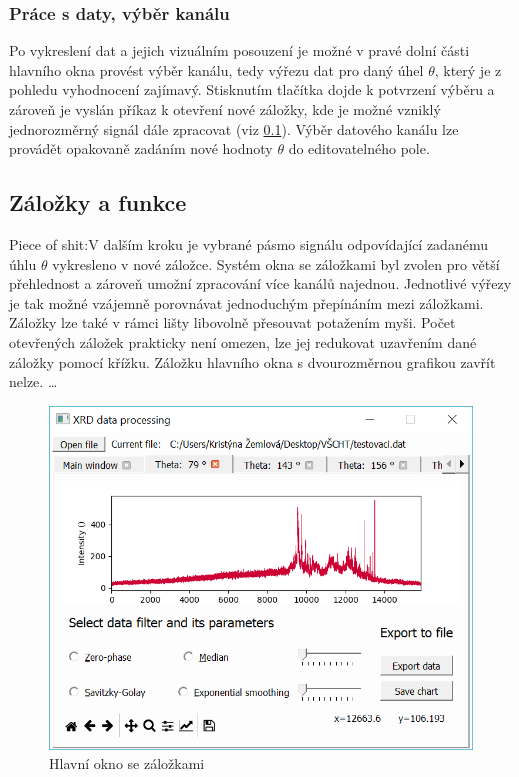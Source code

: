 \documentclass[a4paper, 12pt]{article}
\begin{document}
\subsubsection{Práce s daty, výběr kanálu} \label{sec:channel}
Po vykreslení dat a jejich vizuálním posouzení je možné v pravé dolní části hlavního okna provést výběr kanálu, tedy výřezu dat pro daný úhel $\theta$, který je z pohledu vyhodnocení zajímavý. Stisknutím tlačítka  dojde k potvrzení výběru a zároveň je vyslán příkaz k otevření nové záložky, kde je možné vzniklý jednorozměrný signál dále zpracovat (viz \ref{sec:fcntabs}). Výběr datového kanálu lze provádět opakovaně zadáním nové hodnoty $\theta$ do editovatelného pole.

\subsection{Záložky a funkce} \label{sec:fcntabs}

Piece of shit:\textcolor{cdorange}{V dalším kroku je vybrané pásmo signálu odpovídající zadanému úhlu $\theta$ vykresleno v nové záložce. Systém okna se záložkami byl zvolen pro větší přehlednost a zároveň umožní zpracování více kanálů najednou. Jednotlivé výřezy je tak možné vzájemně porovnávat jednoduchým přepínáním mezi záložkami. Záložky lze také v rámci lišty libovolně přesouvat potažením myši. Počet otevřených záložek prakticky není omezen, lze jej redukovat uzavřením dané záložky pomocí křížku. Záložku hlavního okna s dvourozměrnou grafikou zavřít nelze.}
\vskip 0.3in
\ldots
\vskip 0.3in
\begin{figure}[hbt!]
    \centering
    \includegraphics[width=\linewidth]{gui_tab.png}
    \caption{Hlavní okno se záložkami}
    \label{fig:gui_tab}
\end{figure}
\end{document}
